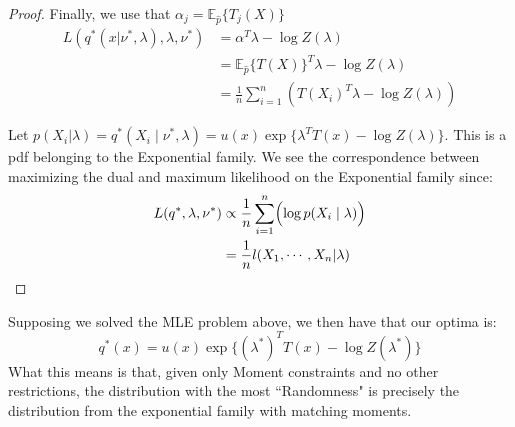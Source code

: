 \documentclass[]{article}
\theoremstyle{mattstyle}
\theoremstyle{definition}
\begin{document}
\begin{proof}
	Finally, we use that $\alpha_j = \mathbb{E}_{\hat{p}}\{T_j(X)\}$
	\begin{align*}
	L(q^*(x| \nu^*, \lambda),\lambda,\nu^*) &= \alpha^T\lambda -\log Z(\lambda)\\
	&= \mathbb{E}_{\hat{p}}\{T(X)\}^T\lambda - \log Z(\lambda)\\
	&= \frac{1}{n}\sum_{i=1}^n \left( T(X_i)^T\lambda - \log Z(\lambda) \right)
	\end{align*}
	
	Let  $p(X_i | \lambda) = q^*(X_i \mid \nu^*, \lambda) = u(x)\exp\{ \lambda^TT(x) - \log Z(\lambda)\}$. This is a pdf belonging to the Exponential family. We see the correspondence between maximizing the dual and maximum likelihood on the Exponential family since:
	\begin{align*}
	L(q^*,\lambda,\nu^*) &\propto \frac{1}{n}\sum_{i=1}^n \Bigl( \log p(X_i \mid \lambda) \Bigr) \\
	&=\frac{1}{n}l(X_1, \cdots, X_n | \lambda)
	\end{align*}
\end{proof}

Supposing we solved the MLE problem above, we then have that our optima is:
$$q^*(x)=u(x)\exp\{ (\lambda^*)^TT(x) - \log Z(\lambda^*)\}$$
What this means is that, given only Moment constraints and no other restrictions, the distribution with the most ``Randomness" is precisely the distribution from the exponential family with matching moments.

\newpage



\end{document}
